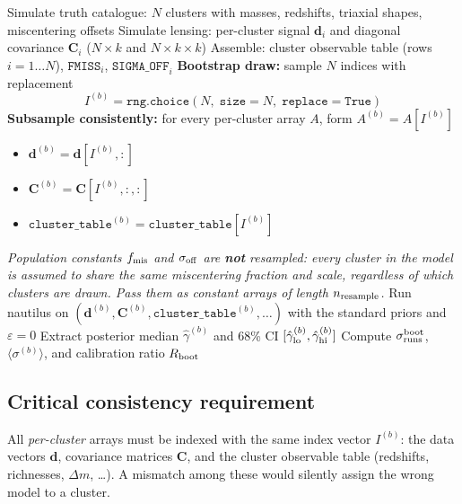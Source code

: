 \documentclass[11pt,a4paper]{article}
\begin{document}
\begin{algorithm}[H]
\caption{Post-hoc bootstrap calibration}
\begin{algorithmic}[1]
  \State Simulate truth catalogue: $N$ clusters with masses, redshifts,
         triaxial shapes, miscentering offsets
  \State Simulate lensing: per-cluster signal $\mathbf{d}_i$ and diagonal
         covariance $\mathbf{C}_i$ ($N\times k$ and $N\times k\times k$)
  \State Assemble: cluster observable table (rows $i = 1\ldots N$),
         $\mathtt{FMISS}_i$, $\mathtt{SIGMA\_OFF}_i$
  \State \textbf{Bootstrap draw:} sample $N$ indices with replacement
         \[I^{(b)} = \mathtt{rng.choice}(N,\; \mathtt{size}=N,\; \mathtt{replace}=\mathtt{True})\]
  \State \textbf{Subsample consistently:} for every per-cluster array $A$,
         form $A^{(b)} = A[I^{(b)}]$
         \begin{itemize}
           \item $\mathbf{d}^{(b)} = \mathbf{d}[I^{(b)},:]$
           \item $\mathbf{C}^{(b)} = \mathbf{C}[I^{(b)},:,:]$
           \item $\mathtt{cluster\_table}^{(b)} = \mathtt{cluster\_table}[I^{(b)}]$
         \end{itemize}
         \textit{Population constants $f_{\rm mis}$ and $\sigma_{\rm off}$ are
         \textbf{not} resampled: every cluster in the model is assumed to share
         the same miscentering fraction and scale, regardless of which clusters
         are drawn.  Pass them as constant arrays of length $n_{\rm resample}$.}
  \State Run nautilus on
         $(\mathbf{d}^{(b)},\mathbf{C}^{(b)},\mathtt{cluster\_table}^{(b)},\ldots)$
         with the standard priors and $\varepsilon = 0$
  \State Extract posterior median $\hat\gamma^{(b)}$ and 68\% CI
         $[\hat\gamma^{(b)}_{\rm lo}, \hat\gamma^{(b)}_{\rm hi}]$
\EndFor
\State Compute $\sigma_{\rm runs}^{\rm boot}$, $\langle\sigma^{(b)}\rangle$,
       and calibration ratio $R_{\rm boot}$
\end{algorithmic}
\end{algorithm}

\subsection{Critical consistency requirement}

All \emph{per-cluster} arrays must be indexed with the same index vector
$I^{(b)}$: the data vectors $\mathbf{d}$, covariance matrices $\mathbf{C}$,
and the cluster observable table (redshifts, richnesses, $\Delta m$, \ldots).
A mismatch among these would silently assign the wrong model to a cluster.
\end{document}
